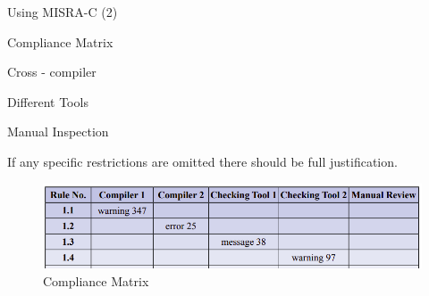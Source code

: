 \documentclass[t]{beamer} %
\begin{document}
\begin{frame}[fragile]{Using MISRA-C (2) }
    \begin{block}{Compliance Matrix} 
    \begin{enumerate}
        \begin{footnotesize}
            \item Cross - compiler
            \item Different Tools
            \item Manual Inspection
        \end{footnotesize}
    \end{enumerate}
    \begin{footnotesize}If any specific restrictions are omitted there should be full justification.\end{footnotesize}
    \begin{figure}
        \centering
        \includegraphics[scale=0.36]{compliance_matrix.png}
        \caption{Compliance Matrix}
        \label{fig:my_label}
    \end{figure}
    \end{block}  
\end{frame}

\end{document}

